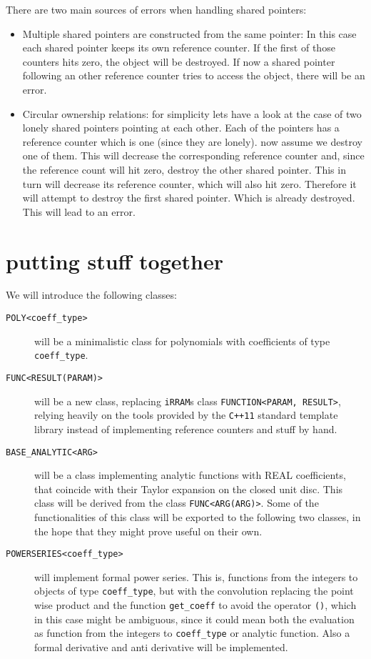 \documentclass{article}
\newcommand{\irrams}{\texttt{iRRAM}s\xspace}
\newcommand{\ccOx}{\texttt{C++11}\xspace}
\newcommand{\ir}[1]{\texttt{#1}}
\newcommand{\code}[1]{\texttt{#1}}
\newcommand{\func}[1]{\texttt{#1}}
\begin{document}
There are two main sources of errors when handling shared pointers:
\begin{itemize}
\item Multiple shared pointers are constructed from the same pointer: In this case each shared pointer keeps its own reference counter. If the first of those counters hits zero, the object will be destroyed. If now a shared pointer following an other reference counter tries to access the object, there will be an error.
\item Circular ownership relations: for simplicity lets have a look at the case of two lonely shared pointers pointing at each other. Each of the pointers has a reference counter which is one (since they are lonely). now assume we destroy one of them. This will decrease the corresponding reference counter and, since the reference count will hit zero, destroy the other shared pointer. This in turn will decrease its reference counter, which will also hit zero. Therefore it will attempt to destroy the first shared pointer. Which is already destroyed. This will lead to an error.
\end{itemize}

\section{putting stuff together}

We will introduce the following classes:
\begin{description}
\item[\func{POLY<coeff\_type>}] will be a minimalistic class for polynomials with coefficients of type \code{coeff\_type}.
\item[\func{FUNC<RESULT(PARAM)>}] will be a new class, replacing \irrams class \ir{FUNCTION<PARAM, RESULT>}, relying heavily on the tools provided by the \ccOx standard template library instead of implementing reference counters and stuff by hand.
\item[\func{BASE\_ANALYTIC<ARG>}] will be a class implementing analytic functions with REAL coefficients, that coincide with their Taylor expansion on the closed unit disc. This class will be derived from the class \func{FUNC<ARG(ARG)>}. Some of the functionalities of this class will be exported to the following two classes, in the hope that they might prove useful on their own.
\item[\func{POWERSERIES<coeff\_type>}] will implement formal power series. This is, functions from the integers to objects of type \code{coeff\_type}, but with the convolution replacing the point wise product and the function \code{get\_coeff} to avoid the operator \code{()}, which in this case might be ambiguous, since it could mean both the evaluation as function from the integers to \code{coeff\_type} or analytic function. Also a formal derivative and anti derivative will be implemented.
\end{description}
\end{document}
